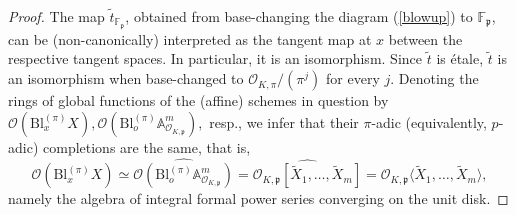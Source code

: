 \documentclass[11pt,oneside]{amsart}
\theoremstyle{plain}
\theoremstyle{definition}
\DeclareMathOperator{\spec}{Spec} \DeclareMathOperator{\sgn}{sign}
\def\F{\mathbb{F}}
\def\oh{\mathcal{O}}
\begin{document}
\begin{proof}

The map $\tilde{t}_{\F_{\mathfrak{p}}}$, obtained from base-changing the diagram (\ref{blowup}) to $\F_{\mathfrak{p}}$, can be (non-canonically) interpreted as the tangent map at $x$ between the respective tangent spaces. In particular, it is an isomorphism. Since $\tilde{t}$ is \'{e}tale, $\tilde{t}$ is an isomorphism when base-changed to ${\oh_{K, \pi}/(\pi^j)}$ for every $j$. Denoting the rings of global functions of the (affine) schemes in question by $\oh(\mathrm{Bl}_x^{(\pi)} X), \oh(\mathrm{Bl}_o^{(\pi)} \mathbb{A}^m_{\oh_{K,\mathfrak{p}}}),$ resp., we infer that their $\pi$-adic (equivalently, $p$-adic) completions are the same, that is,
\begin{equation} \label{p-comp-iso}
\widehat{\oh(\mathrm{Bl}_x^{(\pi)} X)} \simeq \widehat{\oh(\mathrm{Bl}_o^{(\pi)} \mathbb{A}^m_{\oh_{K,\mathfrak{p}}})}=\widehat{\oh_{K, \mathfrak{p}}[\tilde{X}_1, \dots, \tilde{X}_m]}=\oh_{K, \mathfrak{p}}\langle\tilde{X}_1, \dots, \tilde{X}_m \rangle,
\end{equation}
namely the algebra of integral formal power series converging on the unit disk.  


\end{proof}
\end{document}
